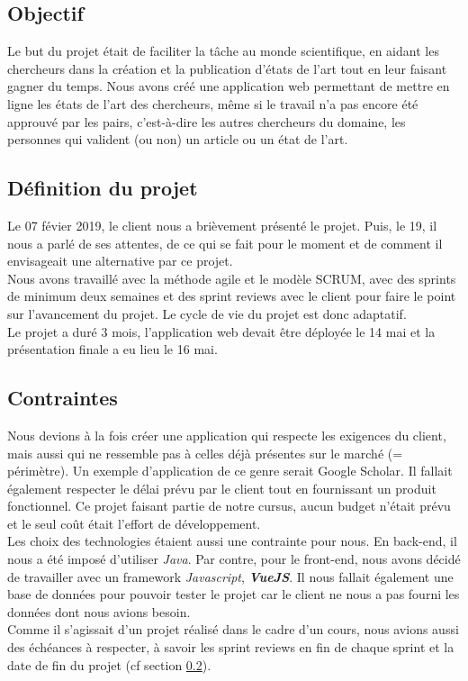 \documentclass[t, 12pt, usenames,dvipsnames]{article}
\begin{document}
        \subsection{Objectif}
            \noindent Le but du projet était de faciliter la tâche au monde scientifique, en aidant les chercheurs dans la création et la publication d'états de l'art tout en leur faisant gagner du temps. Nous avons créé une application web permettant de mettre en ligne les états de l'art des chercheurs, même si le travail n'a pas encore été approuvé par les pairs, c'est-à-dire les autres chercheurs du domaine, les personnes qui valident (ou non) un article ou un état de l'art.
    
        \subsection{Définition du projet}
        \label{section:def_projet}
            \noindent Le 07 févier 2019, le client nous a brièvement présenté le projet. Puis, le 19, il nous a parlé de ses attentes, de ce qui se fait pour le moment et de comment il envisageait une alternative par ce projet.\\
            Nous avons travaillé avec la méthode agile et le modèle SCRUM, avec des sprints de minimum deux semaines et des sprint reviews avec le client pour faire le point sur l'avancement du projet. Le cycle de vie du projet est donc adaptatif.\\
            Le projet a duré 3 mois, l'application web devait être déployée le 14 mai et la présentation finale a eu lieu le 16 mai.
        
        \subsection{Contraintes}
            \noindent Nous devions à la fois créer une application qui respecte les exigences du client, mais aussi qui ne ressemble pas à celles déjà présentes sur le marché (= périmètre). Un exemple d'application de ce genre serait Google Scholar. Il fallait également respecter le délai prévu par le client tout en fournissant un produit fonctionnel. Ce projet faisant partie de notre cursus, aucun budget n'était prévu et le seul coût était l'effort de développement.\\
            \newpage
            Les choix des technologies étaient aussi une contrainte pour nous. En back-end, il nous a été imposé d'utiliser \textit{Java}. Par contre, pour le front-end, nous avons décidé de travailler avec un framework  \textit{Javascript}, \textbf{\textit{VueJS}}. Il nous fallait également une base de données pour pouvoir tester le projet car le client ne nous a pas fourni les données dont nous avions besoin.\\
            Comme il s'agissait d'un projet réalisé dans le cadre d'un cours, nous avions aussi des échéances à respecter, à savoir les sprint reviews en fin de chaque sprint et la date de fin du projet (cf section \ref{section:def_projet}).
            
\end{document}
